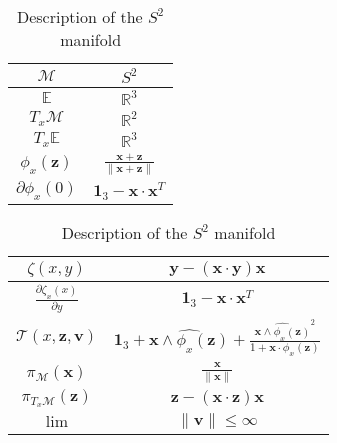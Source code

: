\begin{table} [H]
\caption{Description of the $S^2$ manifold}
\centering
\begin{tabular}{cc}
  \toprule
  $\mathcal{M}$ & $S^2$ \\
  \midrule
  $\mathbb{E}$ & $\mathbb{R}^{3}$ \\
  \midrule
  $T_x\mathcal{M}$ & $\mathbb{R}^2$ \\
  \midrule
  $T_x\mathbb{E}$ & $\mathbb{R}^3$ \\
  \midrule
  $\phi_x(\mathbf{z})$ & $\frac{\mathbf{x}+\mathbf{z}}{\|\mathbf{x}+\mathbf{z}\|}$ \\
  \midrule
  $\partial \phi_x(0)$ & $\mathbf{1}_3 - \mathbf{x}\cdot\mathbf{x}^T$ \\
  \bottomrule
\end{tabular}
\quad
\begin{tabular}{cc}
  \toprule
  $\zeta(x,y)$ & $\mathbf{y} - (\mathbf{x} \cdot \mathbf{y}) \mathbf{x}$ \\
  \midrule
  $\frac{\partial \zeta_x(x)}{\partial y}$ & $\mathbf{1}_3 -\mathbf{x}\cdot\mathbf{x}^T$ \\
  \midrule
  $\mathcal{T}(x,\mathbf{z}, \mathbf{v})$ & $\mathbf{1}_3 + \widehat{\mathbf{x} \wedge \phi_x(\mathbf{z})} + \frac{{\widehat{\mathbf{x} \wedge \phi_x(\mathbf{z})}}^2}{1+\mathbf{x}\cdot\phi_x(\mathbf{z})}$ \\
  \midrule
  $\pi_\mathcal{M}(\mathbf{x})$ & $\frac{\mathbf{x}}{\|\mathbf{x}\|}$ \\
  \midrule
  $\pi_{T_x\mathcal{M}}(\mathbf{z})$ & $\mathbf{z} - (\mathbf{x} \cdot \mathbf{z}) \mathbf{x}$ \\
  \midrule
  $\lim$ & $\|\mathbf{v}\| \leq \infty$ \\
  \bottomrule
\end{tabular}
\end{table}

